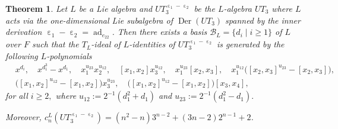 \documentclass[a4paper,reqno]{amsart}
\newtheorem{theorem}{Theorem}
\theoremstyle{definition}
\numberwithin{equation}{section}
\numberwithin{theorem}{section}
\DeclareMathOperator{\e}{\varepsilon}
\DeclareMathOperator{\ad}{ad}
\DeclareMathOperator{\D}{Der}
\begin{document}
\begin{theorem}\label{teo: Id^L UT_3 e1-e2}
   Let $L$ be a Lie algebra and $UT_3^{\e_1-\e_2}$  be the $L$-algebra $UT_3$ where $L$ acts via the one-dimensional Lie subalgebra of $\D(UT_3)$ spanned by the inner derivation $\e_1-\e_2 =\ad_{e_{22}}$. Then  
there exists a basis $\mathcal{B}_L=\{d_i \mid i \geq 1\}$ of $L$ over $F$ such that 
the $T_L$-ideal of $L$-identities of $UT_3^{\e_1-\e_2}$ is generated by the following $L$-polynomials
    \begin{align*} 
       & x^{d_i}, \quad x^{d_1^3}-x^{d_1}, \quad  x_1^{u_{23}}x_2^{u_{12}}, \quad [x_1,x_2]x_3^{u_{12}}, \quad  x_1^{u_{23}}[x_2,x_3],\quad  x_1^{u_{12}} \big([x_2,x_3]^{u_{23}}-[x_2,x_3]\big), \\  & \big([x_1,x_2]^{u_{12}}-[x_1,x_2]\big) x_3^{u_{23}},\quad \big([x_1,x_2]^{u_{12}}-[x_1,x_2]\big)[x_3,x_4],
    \end{align*}
for all $i\geq 2,$ where $u_{12}:=2^{-1}(d_1^2+d_1)$ and $u_{23}:=2^{-1}(d_1^2-d_1).$ 

Moreover, $c_n^L(UT_3^{\e_1 -\e_2})=(n^2-n)3^{n-2}+(3n-2)2^{n-1}+2$.
\end{theorem}
\end{document}

